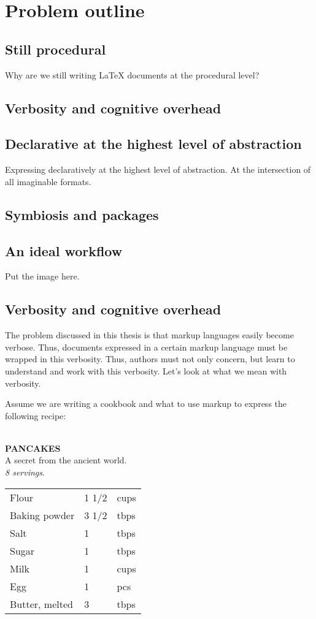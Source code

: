 \documentclass{scrreprt}
\newcommand{\tab}{\hspace*{6pt}}
\newenvironment{example}
{ \hrulefill \vspace{12pt} \\ }
{ \\\\ \vspace{12pt} \hrulefill }
\begin{document}
\section{Problem outline}
\subsection{Still procedural}
Why are we still writing LaTeX documents at the procedural level?
\subsection{Verbosity and cognitive overhead}
\subsection{Declarative at the highest level of abstraction}
Expressing declaratively at the highest level of abstraction. At the intersection of all imaginable formats.
\subsection{Symbiosis and packages}
\subsection{An ideal workflow}
Put the image here.



\subsection{Verbosity and cognitive overhead}
The problem discussed in this thesis is that markup languages easily become verbose. Thus, documents expressed in a certain markup language must be wrapped in this verbosity. Thus, authors must not only concern, but learn to understand and work with this verbosity. Let's look at what we mean with verbosity.

Assume we are writing a cookbook and what to use markup to express the following recipe:

\begin{example}
\tab\tab\tab \textbf{PANCAKES}\\
\tab\tab\tab A secret from the ancient world.\\
\tab\tab\tab \emph{8 servings}.\\

\begin{tabular}{l l l}
Flour & 1 1/2 & cups \\
Baking powder & 3 1/2 & tbps \\
Salt & 1 & tbps \\
Sugar & 1 & tbps \\
Milk & 1 & cups \\
Egg & 1 & pcs\\
Butter, melted & 3 & tbps \\
\end{tabular}
\end{example}
\end{document}

